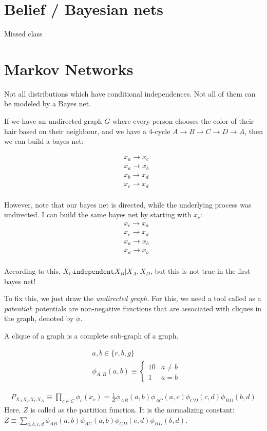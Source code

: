 \documentclass[11pt]{book}
\begin{document}
\chapter{Belief / Bayesian nets}
Missed class
\chapter{Markov Networks}
Not all distributions which have conditional independences. Not all of
them can be modeled by a Bayes net.

If we have an undirected graph $G$ where every person chooses the color of
their hair based on their neighbour, and we have a 4-cycle $A \rightarrow B \rightarrow C \rightarrow D \rightarrow A$,
then we can build a bayes net:

\begin{align*}
&x_a \rightarrow x_c \\
&x_a \rightarrow x_b \\
&x_b \rightarrow x_d \\
&x_c \rightarrow x_d \\
\end{align*}

However, note that our bayes net is directed, while the underlying process
was undirected. I can build the same bayes net by starting with $x_c$:
\begin{align*}
&x_c \rightarrow x_a \\
&x_c \rightarrow x_d \\
&x_a \rightarrow x_b \\
&x_d \rightarrow x_b \\
\end{align*}

According to this, $X_C \texttt{independent} X_B | X_A, X_D$, but this is not
true in the first bayes net!

To fix this, we just draw the \emph{undirected graph}. For this, we need a tool 
called as a \emph{potential}: potentials are non-negative functions that are
associated with cliques in the graph, denoted by $\phi$.

A clique of a graph is a complete sub-graph of a graph.

\begin{align*}
&a, b \in \{ r, b, g \} \\
&\phi_{A, B}(a, b) \equiv \begin{cases} 10 & a \neq b \\ 1 & a = b\end{cases}
\end{align*}

\begin{align*}
    P_{X_A X_B X_C X_D} \equiv \prod_{c \in C} \phi_c (x_c) = 
    \frac{1}{Z} \phi_{AB}(a, b) \phi_{AC}(a, c) \phi_{CD}(c, d) \phi_{BD}(b, d)
\end{align*}
Here, $Z$ is called as the partition function. It is the normalizing
constant: $Z \equiv \sum_{a, b, c, d} \phi_{AB}(a, b) \phi_{AC}(a, b) \phi_{CD}(c, d) \phi_{BD}(b, d)$.
\end{document}
